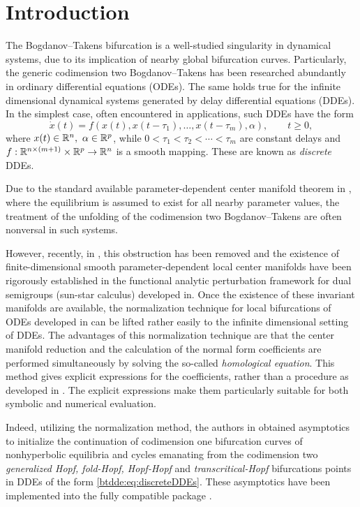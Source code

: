 \section{Introduction} 
The Bogdanov--Takens bifurcation is a well-studied singularity in dynamical
systems, due to its implication of nearby global bifurcation curves.
Particularly, the generic codimension two Bogdanov--Takens has been researched
abundantly in ordinary differential equations (ODEs). The same holds true for
the infinite dimensional dynamical systems generated by delay differential
equations (DDEs). In the simplest case, often encountered in applications, such
DDEs have the form
%
\begin{equation}
    \label{btdde:eq:discreteDDEs} 
    \dot{x}(t) = f(x(t),x(t-\tau_1),\ldots,x(t-\tau_m),\alpha),
    \qquad t \geq 0,
\end{equation}
%
where $x(t) \in \mathbb{R}^n,\ \alpha \in \mathbb{R}^p$, while $0 < \tau_1 < \tau_2 < \cdots
<\tau_m$ are constant delays and $f : \mathbb{R}^{n \times (m + 1)} \times \mathbb{R}^p \to
\mathbb{R}^n$ is a smooth mapping. These are known as \emph{discrete} DDEs.

Due to the standard available parameter-dependent center manifold theorem in
\cite{diekmann1995delay}, where the equilibrium is assumed to exist for all
nearby parameter values, the treatment of the unfolding of the codimension two
Bogdanov--Takens are often nonversal in such systems.

However, recently, in \cite{Switching2019}, this obstruction has been removed
and the existence of finite-dimensional smooth parameter-dependent local center
manifolds have been rigorously established in the functional analytic
perturbation framework for dual semigroups (sun-star calculus) developed
in\cite{Clement1987, Clement1988, Clement1989, Clement1989b}. Once the
existence of these invariant manifolds are available, the normalization
technique for local bifurcations of ODEs developed in \cite{Kuznetsov1999} can
be lifted rather easily to the infinite dimensional setting of DDEs. The
advantages of this normalization technique are that the center manifold
reduction and the calculation of the normal form coefficients are performed
simultaneously by solving the so-called \emph{homological equation}. This
method gives explicit expressions for the coefficients, rather than a procedure
as developed in \cite{Faria1995201, Faria1995}. The explicit expressions make
them particularly suitable for both symbolic and numerical evaluation.

Indeed, utilizing the normalization method, the authors in \cite{Switching2019}
obtained asymptotics to initialize the continuation of codimension one
bifurcation curves of nonhyperbolic equilibria and cycles emanating from the
codimension two \emph{generalized Hopf, fold-Hopf, Hopf-Hopf} and
\emph{transcritical-Hopf} bifurcations points in DDEs of the form \cref{btdde:eq:discreteDDEs}.
These asymptotics have been implemented into the fully \OCTAVE compatible
\MATLAB package \DDEBIFTOOL \cite{DDEBIFTOOL,2014arXiv1406.7144S}. 

